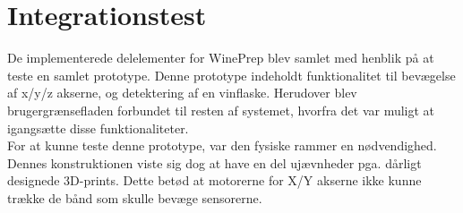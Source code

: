 \chapter{Integrationstest}

De implementerede delelementer for WinePrep blev samlet med henblik på at teste en samlet prototype. Denne prototype indeholdt
funktionalitet til bevægelse af x/y/z akserne, og detektering af en vinflaske. Herudover blev brugergrænsefladen forbundet til 
resten af systemet, hvorfra det var muligt at igangsætte disse funktionaliteter. \\

For at kunne teste denne prototype, var den fysiske rammer en nødvendighed. Dennes konstruktionen viste sig dog at have en del
ujævnheder pga. dårligt designede 3D-prints. Dette betød at motorerne for X/Y akserne ikke kunne trække de bånd som skulle 
bevæge sensorerne.